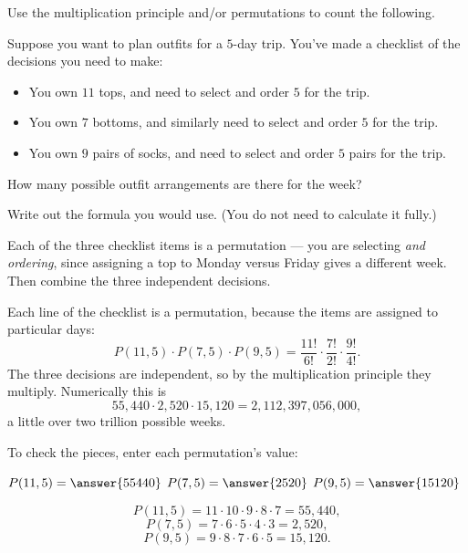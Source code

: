 \documentclass[12pt]{ximera}
\begin{document}
\begin{problem}
Use the multiplication principle and/or permutations to count the following.

Suppose you want to plan outfits for a $5$-day trip. You've made a checklist of the
decisions you need to make:
\begin{itemize}
    \item You own $11$ tops, and need to select and order $5$ for the trip.
    \item You own $7$ bottoms, and similarly need to select and order $5$ for the trip.
    \item You own $9$ pairs of socks, and need to select and order $5$ pairs for the trip.
\end{itemize}
How many possible outfit arrangements are there for the week?

\begin{prompt}
Write out the formula you would use. (You do not need to calculate it fully.)

\begin{freeResponse}
\end{freeResponse}

\begin{hint}
Each of the three checklist items is a permutation --- you are selecting \emph{and
ordering}, since assigning a top to Monday versus Friday gives a different week.
Then combine the three independent decisions.
\end{hint}

\begin{feedback}
Each line of the checklist is a permutation, because the items are assigned to
particular days:
\[
P(11,5)\cdot P(7,5)\cdot P(9,5)
= \frac{11!}{6!}\cdot\frac{7!}{2!}\cdot\frac{9!}{4!}.
\]
The three decisions are independent, so by the multiplication principle they
multiply. Numerically this is
\[
55{,}440 \cdot 2{,}520 \cdot 15{,}120 = 2{,}112{,}397{,}056{,}000,
\]
a little over two trillion possible weeks.
\end{feedback}
\end{prompt}

\begin{prompt}
To check the pieces, enter each permutation's value:

$P(11,5)=\answer{55440}$ \qquad
$P(7,5)=\answer{2520}$ \qquad
$P(9,5)=\answer{15120}$

\begin{feedback}
\[
P(11,5)=11\cdot 10\cdot 9\cdot 8\cdot 7 = 55{,}440,
\]
\[
P(7,5)=7\cdot 6\cdot 5\cdot 4\cdot 3 = 2{,}520,
\]
\[
P(9,5)=9\cdot 8\cdot 7\cdot 6\cdot 5 = 15{,}120.
\]
\end{feedback}
\end{prompt}
\end{problem}
\end{document}
